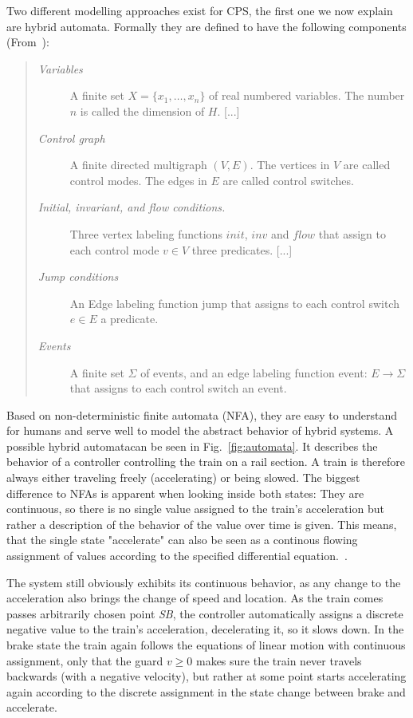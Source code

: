 Two different modelling approaches exist for CPS, the first one we now explain are hybrid automata. Formally they are defined to have the following components (From~\cite{Heinzinger2000b}):
\begin{quote}
		\begin{description}
			\item[\textit{Variables}]A finite set \(X = \{x_1,\dots , x_n\}\) of real numbered variables. The number \(n\) is called the dimension of \(H\). [...]
			\item[\textit{Control graph}]A finite directed multigraph \((V, E)\). The vertices in \(V\) are called control modes. The edges in \(E\) are called control switches.
			\item[\textit{Initial, invariant, and flow conditions.}]Three vertex labeling functions \(init\), \(inv\) and \(flow\) that assign to each control mode \(v\in V\) three predicates. [...]
			\item[\textit{Jump conditions}]An Edge labeling function jump that assigns to each control switch  \(e \in E\) a predicate.
			\item[\textit{Events}]A finite set \(\Sigma\) of events, and an edge labeling function event: \(E \rightarrow \Sigma\) that assigns to each control switch an event.
		\end{description}
\end{quote} 

Based on non-deterministic finite automata (NFA), they are easy to understand for humans and serve well to model the abstract behavior of hybrid systems. A possible hybrid automatacan be seen in Fig.~\ref{fig:automata}. It describes the behavior of a controller controlling the train on a rail section. A train is therefore always either traveling freely (accelerating)  or being slowed. The biggest difference to NFAs is apparent when looking inside both states: They are continuous, so there is no single value assigned to the train's acceleration but rather a description of the behavior of the value over time is given. This means, that the single state "accelerate" can also be seen as a continous flowing assignment of values according to the specified differential equation.~\cite{platzer2010b}.

The system still obviously exhibits its continuous behavior, as any change to the acceleration also brings the change of speed and location. As the train comes passes arbitrarily chosen point \emph{SB}, the controller automatically assigns a discrete negative value to the train's acceleration, decelerating it, so it slows down. In the brake state the train again follows the equations of linear motion with continuous assignment, only that the guard \(v \geq 0\) makes sure the train never travels backwards (with a negative velocity), but rather at some point starts accelerating again according to the discrete assignment in the state change between brake and accelerate.

